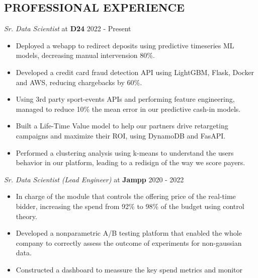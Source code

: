 \documentclass[margin]{res}
\begin{document}
\begin{resume}
    \section{PROFESSIONAL EXPERIENCE} 
    {\sl Sr. Data Scientist} at {\bf D24} \hfill 2022 - Present
    \begin{itemize}  \itemsep -2pt %
        \item Deployed a webapp to redirect deposits using predictive timeseries ML models, decreasing
            manual intervension 80\%.
        \item Developed a credit card fraud detection API using LightGBM, Flask, Docker and AWS, 
            reducing chargebacks by 60\%.
        \item Using 3rd party sport-events APIs and performing feature engineering, managed to 
            reduce 10\% the mean error in our predictive cash-in models.
        \item Built a Life-Time Value model to help our partners drive retargeting campaigns and maximize their ROI,
            using DynamoDB and FasAPI.
        \item Performed a clustering analysis using k-means to understand the users behavior in our platform, 
            leading to a redisign of the way we score payers.
    \end{itemize}
    {\sl Sr. Data Scientist (Lead Engineer)} at {\bf Jampp} \hfill 2020 - 2022
    \begin{itemize}  \itemsep -2pt %
        \item In charge of the module that controls the offering price of the
            real-time bidder, increasing the spend from 92\% to 98\%
            of the budget using control theory.
        \item Developed a nonparametric A/B testing platform that enabled the whole company to 
            correctly assess the outcome of experiments for non-gaussian data. 
        \item Constructed a dashboard to meassure the key spend metrics and monitor

\end{itemize}
\end{resume}
\end{document}
